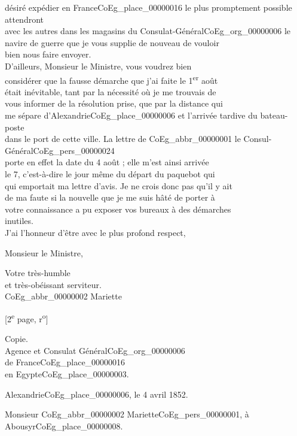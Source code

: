 \documentclass{book}
\begin{document}
désiré expédier en France\gls{CoEg_place_00000016} le plus promptement possible attendront\\
avec les autres dans les magasins du Consulat-Général\gls{CoEg_org_00000006} le\\
navire de guerre que je vous supplie de nouveau de vouloir\\
bien nous faire envoyer.\\
\indent D’ailleurs, Monsieur le Ministre, vous voudrez bien\\
considérer que la fausse démarche que j’ai faite le 1\textsuperscript{er} août\\
était inévitable, tant par la nécessité où je me trouvais de\\
vous informer de la résolution prise, que par la distance qui\\
me sépare d’Alexandrie\gls{CoEg_place_00000006} et l’arrivée tardive du bateau-poste\\
dans le port de cette ville. La lettre de \gls{CoEg_abbr_00000001} le Consul-Général\gls{CoEg_pers_00000024}\\
porte en effet la date du 4 août ; elle m’est ainsi arrivée\\
le 7, c’est-à-dire le jour même du départ du paquebot qui\\
qui emportait ma lettre d’avis. Je ne crois donc pas qu’il y ait\\
de ma faute si la nouvelle que je me suis hâté de porter à\\
votre connaissance a pu exposer vos bureaux à des démarches\\
inutiles.\\
\indent J’ai l’honneur d’être avec le plus profond respect,
\begin{center} Monsieur le Ministre,\end{center}
\begin{center}\hspace{5cm} Votre très-humble\\
\hspace{5cm} et très-obéissant serviteur.\\
\hspace{5cm} \gls{CoEg_abbr_00000002} Mariette\end{center}
{\footnotesize \begin{center} {[2\textsuperscript{e} page, r\textsuperscript{o}]}\end{center}}
Copie.\\
Agence et Consulat Général\gls{CoEg_org_00000006}\\
\hspace{3cm} de France\gls{CoEg_place_00000016}\\
\hspace{3cm} en Egypte\gls{CoEg_place_00000003}.
\begin{flushright}Alexandrie\gls{CoEg_place_00000006}, le 4 avril 1852.\end{flushright}
\begin{flushright}Monsieur \gls{CoEg_abbr_00000002} Mariette\gls{CoEg_pers_00000001}, à Abousyr\gls{CoEg_place_00000008}.\end{flushright}
\end{document}

